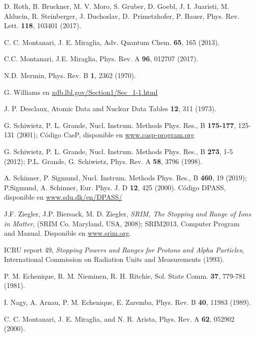 \begin{thebibliography}{9}
D. Roth, B. Bruckner, M. V. Moro, S. Gruber, D. Goebl, J. I. Juaristi,
M. Alducin, R. Steinberger, J. Duchoslav, \mbox{D. Primetzhofer}, P. Bauer,
Phys. Rev. Lett. \textbf{118}, 103401 (2017).

C. C. Montanari, J. E. Miraglia,
Adv. Quantum Chem. \textbf{65}, 165 (2013).

C.C. Montanari, J.E. Miraglia, 
Phys. Rev. A \textbf{96}, 012707 (2017).

N.D. Mermin, 
Phys. Rev. B \textbf{1}, 2362 (1970).

G. Williams en 
\href{http://xdb.lbl.gov/Section1/Sec\_1-1.html}{xdb.lbl.gov/Section1/Sec\_1-1.html}

J. P. Desclaux,
Atomic Data and Nuclear Data Tables \textbf{12}, 311 (1973).

G. Schiwietz, P. L. Grande, 
Nucl. Instrum. Methods Phys. Res., B \textbf{175-177}, 125-131 (2001); 
Código CasP, disponible en \href{https://www.casp-program.org}{www.casp-program.org}

G. Schiwietz, P. L. Grande,
Nucl. Instrum. Methods Phys. Res., B \textbf{273}, 1-5 (2012); 
P.L. Grande, G. Schiwietz, 
Phys. Rev. A \textbf{58}, 3796 (1998).

A. Schinner, P. Sigmund, 
Nucl. Instrum. Methods Phys. Res., B \textbf{460}, 19 (2019); 
P.Sigmund, A. Schinner, 
Eur. Phys. J. D \textbf{12}, 425 (2000). 
Código DPASS, disponible en \href{https://www.sdu.dk/en/DPASS/}{www.sdu.dk/en/DPASS/}

J.F. Ziegler, J.P. Biersack, M. D. Ziegler, 
\textit{SRIM, The Stopping and Range of Ions in Matter}, 
(SRIM Co. Maryland, USA, 2008); 
SRIM2013, Computer Program and Manual. Disponible en \href{https://www.srim.org}{www.srim.org}.

ICRU report 49, \textit{Stopping Powers and Ranges for Protons and Alpha Particles},
International Commission on Radiation Units and Measurements (1993).

P. M. Echenique, R. M. Nieminen, R. H. Ritchie, 
Sol. State Comm. \textbf{37}, 779-781 (1981).

I. Nagy, A. Arnau, P. M. Echenique, E. Zaremba, 
Phys. Rev. B \textbf{40}, 11983 (1989).

C. C. Montanari, J. E. Miraglia, and N. R. Arista, 
Phys. Rev. A \textbf{62}, 052902 (2000).


\end{thebibliography}
